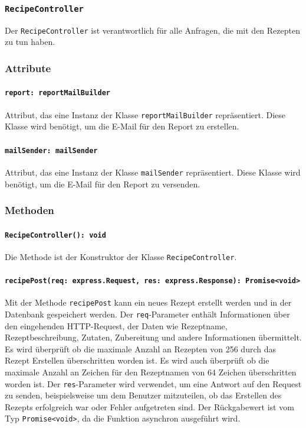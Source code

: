 \documentclass{entwurfsheft}
\begin{document}
\subsubsection{\texttt{RecipeController}}\label{sec:RecipeController}
Der \texttt{RecipeController} ist verantwortlich für alle Anfragen, die mit den Rezepten zu tun haben.
\subsubsection*{Attribute}
\paragraph{\texttt{report: reportMailBuilder}}
Attribut, das eine Instanz der Klasse \texttt{reportMailBuilder} repräsentiert. Diese Klasse wird benötigt, um die E-Mail für den Report zu erstellen.
\paragraph{\texttt{mailSender: mailSender}}
Attribut, das eine Instanz der Klasse \texttt{mailSender} repräsentiert. Diese Klasse wird benötigt, um die E-Mail für den Report zu versenden.
\subsubsection*{Methoden}
\paragraph{\texttt{RecipeController(): void}}
Die Methode ist der Konstruktor der Klasse \texttt{RecipeController}.
\paragraph{\texttt{recipePost(req: express.Request, res: express.Response): Promise<void>}}
Mit der Methode \texttt{recipePost} kann ein neues Rezept erstellt werden und in der Datenbank gespeichert werden. Der \texttt{req}-Parameter enthält Informationen über den eingehenden HTTP-Request, der Daten wie Rezeptname, Rezeptbeschreibung, Zutaten, Zubereitung und andere Informationen übermittelt. Es wird überprüft ob die maximale Anzahl an Rezepten von 256 durch das Rezept Erstellen überschritten worden ist. Es wird auch überprüft ob die maximale Anzahl an Zeichen für den Rezeptnamen von 64 Zeichen überschritten worden ist.
Der \texttt{res}-Parameter wird verwendet, um eine Antwort auf den Request zu senden, beispielsweise um dem Benutzer mitzuteilen, ob das Erstellen des Rezepts erfolgreich war oder Fehler aufgetreten sind.
Der Rückgabewert ist vom Typ \texttt{Promise<void>}, da die Funktion asynchron ausgeführt wird.
\end{document}
